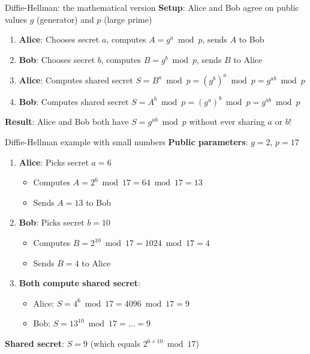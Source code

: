 \documentclass[aspectratio=169, lualatex, handout]{beamer}
\begin{document}
\begin{frame}{Diffie-Hellman: the mathematical version}
	\textbf{Setup}: Alice and Bob agree on public values $g$ (generator) and $p$ (large prime)
	\vspace{0.5cm}
	\begin{enumerate}[<+->]
		\item \textbf{Alice}: Chooses secret $a$, computes $A = g^a \bmod p$, sends $A$ to Bob
		\item \textbf{Bob}: Chooses secret $b$, computes $B = g^b \bmod p$, sends $B$ to Alice
		\item \textbf{Alice}: Computes shared secret $S = B^a \bmod p = (g^b)^a \bmod p = g^{ab} \bmod p$
		\item \textbf{Bob}: Computes shared secret $S = A^b \bmod p = (g^a)^b \bmod p = g^{ab} \bmod p$
	\end{enumerate}
	\vspace{0.5cm}
	\textbf{Result}: Alice and Bob both have $S = g^{ab} \bmod p$ without ever sharing $a$ or $b$!
\end{frame}

\begin{frame}{Diffie-Hellman example with small numbers}
	\textbf{Public parameters}: $g = 2$, $p = 17$
	\vspace{0.5cm}
	\begin{enumerate}[<+->]
		\item \textbf{Alice}: Picks secret $a = 6$
		      \begin{itemize}
			      \item Computes $A = 2^6 \bmod 17 = 64 \bmod 17 = 13$
			      \item Sends $A = 13$ to Bob
		      \end{itemize}
		\item \textbf{Bob}: Picks secret $b = 10$
		      \begin{itemize}
			      \item Computes $B = 2^{10} \bmod 17 = 1024 \bmod 17 = 4$
			      \item Sends $B = 4$ to Alice
		      \end{itemize}
		\item \textbf{Both compute shared secret}:
		      \begin{itemize}
			      \item Alice: $S = 4^6 \bmod 17 = 4096 \bmod 17 = 9$
			      \item Bob: $S = 13^{10} \bmod 17 = \ldots = 9$
		      \end{itemize}
	\end{enumerate}
	\textbf{Shared secret}: $S = 9$ (which equals $2^{6 \times 10} \bmod 17$)
\end{frame}
\end{document}
